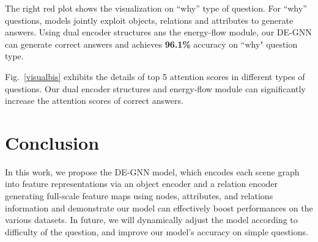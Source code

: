 \documentclass[letterpaper]{article} %
\begin{document}
The right red plot shows the visualization on ``why'' type of question. 
For ``why'' questions, models jointly exploit objects, relations and attributes to generate answers. Using dual encoder structures ans the energy-flow module, our DE-GNN can generate correct answers and achieves \textbf{96.1\%} accuracy on ``why" question type.

Fig.~\ref{visualbis} exhibits the details of top 5 attention scores in different types of questions. Our dual encoder structures and energy-flow module can significantly increase the attention scores of correct answers.


\section{Conclusion}
In this work, 
we propose the DE-GNN model, which encodes each scene graph into feature representations via an object encoder and a relation encoder generating full-scale feature maps using nodes, attributes, and relations information and demonstrate our model can effectively boost performances on the various datasets. 
In future, we will dynamically adjust the model according to difficulty of the question, and improve our model's accuracy on simple questions.


\newpage


\clearpage

\end{document}
